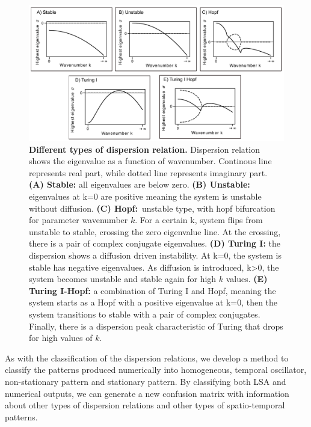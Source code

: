 
\begin{figure}[H] %
    \centering
    \includegraphics[width=1\textwidth]{chapters/Chapter 1/dispersions} %
    \caption{\textbf{Different types of dispersion relation.} Dispersion relation shows the eigenvalue as a function of wavenumber. Continous line represents real part, while dotted line represents imaginary part. \textbf{(A) Stable:} all eigenvalues are below zero. \textbf{(B) Unstable:} eigenvalues at k=0 are positive meaning the system is unstable without diffusion. \textbf{(C) Hopf:}~unstable type, with hopf bifurcation for parameter wavenumber $k$. For a certain k, system flips from unstable to stable, crossing the zero eigenvalue line. At the crossing, there is a pair of complex conjugate eigenvalues. \textbf{(D) Turing I:} the dispersion shows a diffusion driven instability. At k=0, the system is stable has negative eigenvalues. As diffusion is introduced, k>0, the system becomes unstable and stable again for high $k$ values. \textbf{(E) Turing I-Hopf:} a combination of Turing I and Hopf, meaning the system starts as a Hopf with a positive eigenvalue at k=0, then the system transitions to stable with a pair of complex conjugates. Finally, there is a dispersion peak characteristic of Turing that drops for high values of $k$.}
    \label{fig:dispersions} %
\end{figure}

As with the classification of the dispersion relations, we develop a method to classify the patterns produced numerically into homogeneous, temporal oscillator, non-stationary pattern and stationary pattern.
By classifying both LSA and numerical outputs, we can generate a new confusion matrix with information about other types of dispersion relations and other types of spatio-temporal patterns.

